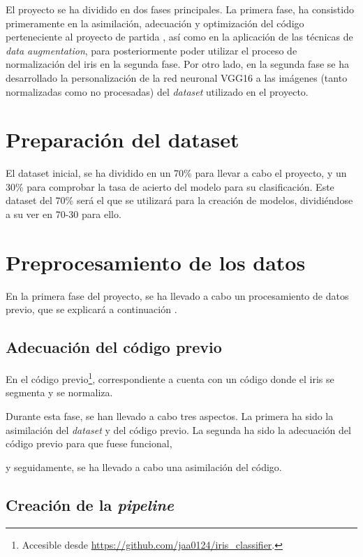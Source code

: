  \label{capitulo5}

El proyecto se ha dividido en dos fases principales. La primera fase, ha consistido primeramente en la asimilación, adecuación y optimización del código perteneciente
al proyecto de partida \cite{tfg_iris_2020}, así como en la aplicación de las técnicas de \textit{data augmentation}, para posteriormente poder utilizar el proceso de normalización del iris en la segunda fase. 
Por otro lado, en la segunda fase se ha desarrollado la personalización de la red neuronal VGG16 a las imágenes (tanto normalizadas como no procesadas) del \textit{dataset} utilizado en el proyecto.


\section{Preparación del dataset}

El dataset inicial, se ha dividido en un 70\% para llevar a cabo el proyecto, y un 30\% para comprobar la tasa de acierto del modelo para su clasificación. 
Este dataset del 70\% será el que se utilizará para la creación de modelos, dividiéndose a su ver en 70-30 para ello. 

\section{Preprocesamiento de los datos}

En la primera fase del proyecto, se ha llevado a cabo un procesamiento de datos previo, que se explicará a continuación .

\subsection{Adecuación del código previo}

En el código previo\footnote{Accesible desde \url{https://github.com/jaa0124/iris_classifier}.}, correspondiente a \cite{tfg_iris_2020} cuenta con un código donde el iris se segmenta y se normaliza.

Durante esta fase, se han llevado a cabo tres aspectos. La primera ha sido la asimilación del \textit{dataset} y del código previo. La segunda ha sido la adecuación del código previo para que fuese funcional,

y seguidamente, se ha llevado a cabo una asimilación del código. 

\subsection{Creación de la \textit{pipeline}}

